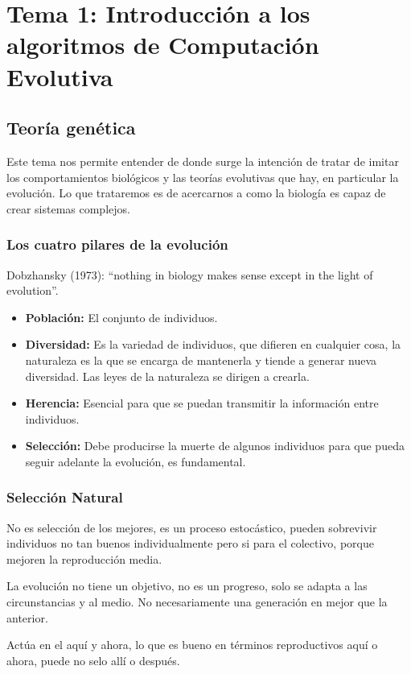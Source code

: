 \documentclass[12pt, twoside, openright]{report} %
\begin{document}
\chapter{Tema 1: Introducción a los algoritmos de Computación Evolutiva}
\section{Teoría genética}
Este tema nos permite entender de donde surge la intención de tratar de imitar los comportamientos biológicos y las teorías evolutivas que hay, en particular la evolución. Lo que trataremos es de acercarnos a como la biología es capaz de crear sistemas complejos.

\subsection{Los cuatro pilares de la evolución}
Dobzhansky (1973): “nothing in biology makes sense except in the light of evolution”.

\begin{itemize}
	\item \textbf{Población:} El conjunto de individuos.
	\item \textbf{Diversidad:} Es la variedad de individuos, que difieren en cualquier cosa, la naturaleza es la que se encarga de mantenerla y tiende a generar nueva diversidad. Las leyes de la naturaleza se dirigen a crearla.
	\item \textbf{Herencia:} Esencial para que se puedan transmitir la información entre individuos.
	\item \textbf{Selección:} Debe producirse la muerte de algunos individuos para que pueda seguir adelante la evolución, es fundamental.
\end{itemize}

\subsection{Selección Natural}
No es selección de los mejores, es un proceso estocástico, pueden sobrevivir individuos no tan buenos individualmente  pero si para el colectivo, porque mejoren la reproducción media.

La evolución no tiene un objetivo, no es un progreso, solo se adapta a las circunstancias y al medio. No necesariamente una generación en mejor que la anterior.

Actúa en el aquí y ahora, lo que es bueno en términos reproductivos aquí o ahora, puede no selo allí o después.
\end{document}
